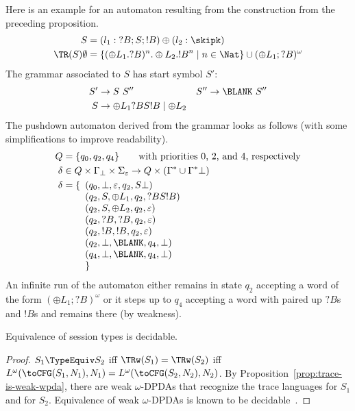Here is an example for an automaton resulting from the construction from the preceding proposition. 
\begin{align*}
  S & = (l_1 : {?B}; S; !B) \oplus (l_2 : \skipk)
  \\
  \TR (S) \emptyset & = \{ (\oplus L_1.?B)^n.\oplus L_2.{!B}^n \mid n \in \Nat\} \cup (\oplus L_1; ?B)^\omega
\end{align*}
The grammar associated to $S$ has start symbol $S'$:
\begin{align*}
  S' & \to S\ S'' & S'' & \to \BLANK\ S'' \\
  S & \to {\oplus L_1} {?B} S {!B} \mid {\oplus L_2} 
\end{align*}
The pushdown automaton derived from the grammar looks as follows (with some simplifications to improve readability).
\begin{align*}
  Q &= \{ q_0, q_2, q_4 \}  \qquad \text{with priorities $0$, $2$, and $4$, respectively}\\
  \delta & \in Q \times \Gamma_\bot \times \Sigma_\varepsilon \to Q \times (\Gamma^* \cup \Gamma^*\bot) \\
  \delta & = \{
           \begin{array}[t]{l}
             (q_0, \bot, \varepsilon, q_2, S\bot) \\
             (q_2, S, {\oplus L_1}, q_2, {?B} S {!B}) \\
             (q_2, S, {\oplus L_2}, q_2, \varepsilon) \\
             (q_2, {?B}, {?B}, q_2, \varepsilon) \\
             (q_2, {!B}, {!B}, q_2, \varepsilon) \\
             (q_2, \bot, \BLANK, q_4, \bot) \\
             (q_4, \bot, \BLANK, q_4, \bot) \\
             \} \\
           \end{array}
\end{align*}
An infinite run of the automaton either remains in state $q_2$ accepting a word of the form $(\oplus L_1;
?B)^\omega$ or it steps up to $q_4$ accepting a word with paired up $?B$s and $!B$s
and remains there (by weakness). 
\begin{theorem}
  Equivalence of session types is decidable.
\end{theorem}
\begin{proof}
  $S_1 \TypeEquiv S_2$ iff $\TRw (S_1) = \TRw (S_2)$ iff $L^\omega (\toCFG (S_1,
  N_1), N_1) = L^\omega (\toCFG (S_2, N_2), N_2)$. By Proposition~\ref{prop:trace-is-weak-wpda},
  there are weak $\omega$-DPDAs that recognize the trace languages for $S_1$ and for
  $S_2$. Equivalence of weak $\omega$-DPDAs is known to be decidable~\cite{DBLP:conf/mfcs/LodingR12}.
\end{proof}



